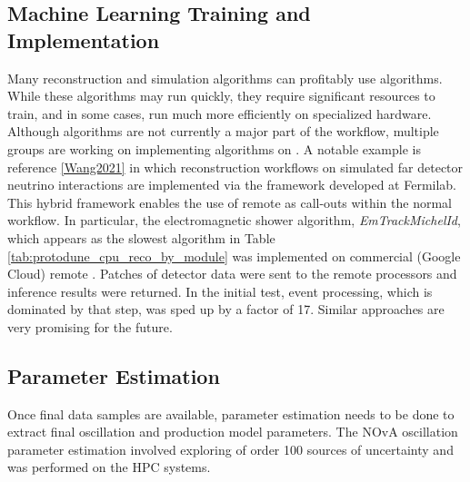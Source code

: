 \documentclass[../main-v1.tex]{subfiles}
\begin{document}
\subsection{Machine Learning Training and Implementation} 
Many reconstruction and simulation algorithms can profitably use  algorithms.  While these algorithms may run quickly, they   require significant resources to train, and in some cases, run much more efficiently on specialized hardware.  Although  algorithms are not currently a major part of the  workflow, multiple groups are working on implementing  algorithms on .  A notable example is reference \ref{Wang2021} in which  reconstruction workflows on simulated far detector neutrino interactions are implemented via the  framework developed at Fermilab. This hybrid framework enables the use of remote  as call-outs within the normal workflow.  In particular, the electromagnetic shower algorithm, {\it EmTrackMichelId}, which appears as the slowest algorithm in Table \ref{tab:protodune_cpu_reco_by_module} was implemented on commercial (Google Cloud) remote . Patches of detector data were sent to the remote processors and inference results were returned.  In the initial test, event processing, which is dominated by that step, was sped up by a factor of 17. Similar approaches are very promising for the future.  


\subsection{Parameter Estimation}
Once final data samples are available, parameter estimation needs to be done to extract final oscillation and production  model parameters.  The NOvA oscillation parameter estimation \cite{NOvA:2021nfi} involved exploring of order 100 sources of uncertainty and was performed on the  HPC systems.  

\end{document}
